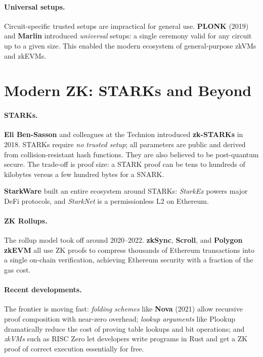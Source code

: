 \paragraph{Universal setups.}
Circuit-specific trusted setups are impractical for general use. \textbf{PLONK} (2019) and \textbf{Marlin} introduced \emph{universal} setups: a single ceremony valid for any circuit up to a given size. This enabled the modern ecosystem of general-purpose zkVMs and zkEVMs.

\section{Modern ZK: STARKs and Beyond}

\paragraph{STARKs.}
\textbf{Eli Ben-Sasson} and colleagues at the Technion introduced \textbf{zk-STARKs} in 2018. STARKs require \emph{no trusted setup}; all parameters are public and derived from collision-resistant hash functions. They are also believed to be post-quantum secure. The trade-off is proof size: a STARK proof can be tens to hundreds of kilobytes versus a few hundred bytes for a SNARK.

\textbf{StarkWare} built an entire ecosystem around STARKs: \textit{StarkEx} powers major DeFi protocols, and \textit{StarkNet} is a permissionless L2 on Ethereum.

\paragraph{ZK Rollups.}
The rollup model took off around 2020--2022. \textbf{zkSync}, \textbf{Scroll}, and \textbf{Polygon zkEVM} all use ZK proofs to compress thousands of Ethereum transactions into a single on-chain verification, achieving Ethereum security with a fraction of the gas cost.

\paragraph{Recent developments.}
The frontier is moving fast: \emph{folding schemes} like \textbf{Nova} (2021) allow recursive proof composition with near-zero overhead; \emph{lookup arguments} like Plookup dramatically reduce the cost of proving table lookups and bit operations; and \emph{zkVMs} such as RISC Zero let developers write programs in Rust and get a ZK proof of correct execution essentially for free.

